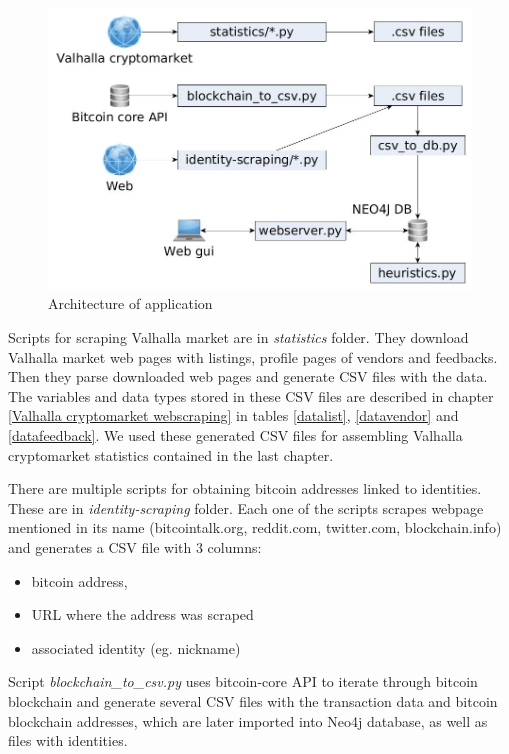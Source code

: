 \documentclass[
  digital, %
  table,   %
  lof,     %
  lot,     %
  oneside
]{fithesis3}
\begin{document}
\begin{figure}[!htb]
    \centering
    \includegraphics[width=1\textwidth]{application_architecture}
    \caption{Architecture of application}
    \label{application_architecture}
\end{figure}

Scripts for scraping Valhalla market are in \emph{statistics} folder.
They download Valhalla market web pages with listings, profile pages of vendors and feedbacks.
Then they parse downloaded web pages and generate CSV files with the data.
The variables and data types stored in these CSV files are described in chapter \ref{Valhalla cryptomarket webscraping}
in tables \ref{datalist}, \ref{datavendor} and \ref{datafeedback}. We used these generated CSV files for
assembling Valhalla cryptomarket statistics contained in the last chapter.

There are multiple scripts for obtaining bitcoin addresses linked to identities. These are in \emph{identity-scraping} folder.
Each one of the scripts scrapes webpage mentioned in its name (bitcointalk.org, reddit.com, twitter.com, blockchain.info) and generates a CSV file with 3 columns:
\begin{itemize}
 \item bitcoin address,
 \item URL where the address was scraped 
 \item associated identity (eg. nickname)
\end{itemize}

Script \emph{blockchain\_to\_csv.py} uses bitcoin-core API to iterate through bitcoin blockchain 
and generate several CSV files with the transaction data and bitcoin blockchain addresses, which are later imported into Neo4j database, as well as 
files with identities.
\end{document}
